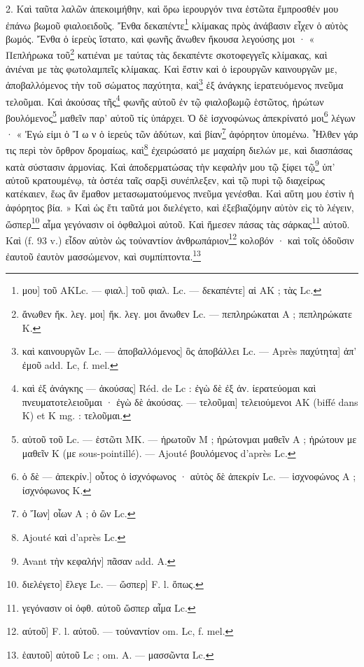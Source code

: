 \documentclass[landscape, a4paper, 11pt, oneside, polutonikogreek, french]{article}
\begin{document}
2. Καὶ ταῦτα λαλῶν ἀπεκοιμήθην, καὶ ὅρω ἱερουργόν τινα ἑστῶτα ἔμπροσθέν μου ἐπάνω βωμοῦ φιαλοειδοῦς. Ἔνθα δεκαπέντε\footnote{μου] τοῦ AKLc. --- φιαλ.] τοῦ φιαλ. Lc. --- δεκαπέντε] αἱ AK ; τὰς Lc.} κλίμακας πρὸς ἀνάβασιν εἶχεν ὁ αὐτὸς βωμός. Ἔνθα ὁ ίερεὺς ἵστατο, καὶ φωνῆς ἄνωθεν ἤκουσα λεγούσης μοι · « Πεπλήρωκα τοῦ\footnote{ἄνωθεν ἤκ. λεγ. μοι] ἤκ. λεγ. μοι ἄνωθεν Lc. --- πεπληρώκαται A ; πεπληρώκατε K.} κατιέναι με ταύτας τὰς δεκαπέντε σκοτοφεγγεῖς κλίμακας, καὶ ἀνιέναι με τὰς φωτολαμπεῖς κλίμακας. Καὶ ἔστιν καὶ ὁ ἱερουργῶν καινουργῶν με, ἀποβαλλόμενος τὴν τοῦ σώματος παχύτητα, καὶ\footnote{καὶ καινουργῶν Lc. --- ἀποβαλλόμενος] ὃς ἀποβάλλει Lc. --- Après παχύτητα] ἀπ' ἐμοῦ add. Lc, f. mel.} ἐξ ἀνάγκης ἱερατευόμενος πνεῦμα τελοῦμαι. Καὶ ἀκούσας τῆς\footnote{καὶ ἐξ ἀνάγκης --- ἀκούσας] Réd. de Lc : ἐγὼ δὲ ἐξ ἀν. ίερατεύομαι καὶ πνευματοτελειοῦμαι · ἐγὼ δὲ ἀκούσας. --- τελοῦμαι] τελειούμενοι AK (biffé dans K) et K mg. : τελοῦμαι.} φωνῆς αὐτοῦ ἐν τῷ φιαλοβωμῷ ἑστῶτος, ἠρώτων βουλόμενος\footnote{αὐτοῦ τοῦ Lc. --- ἑστῶτι MK. --- ἠρωτοῦν M ; ἡρώτονμαι μαθεῖν A ; ἠρώτουν με μαθεῖν K (με sous-pointillé). --- Ajouté βουλόμενος d'après Lc.} μαθεῖν παρ' αὐτοῦ τίς ὑπάρχει. Ὁ δὲ ἰσχνοφώνως ἀπεκρίνατό μοι\footnote{ὁ δὲ --- ἀπεκρίν.] οὗτος ὁ ἰσχνόφωνος · αὐτὸς δὲ ἀπεκρίν Lc. --- ἰσχνοφώνος A ; ίσχνόφωνος K.} λέγων · « Ἐγώ εἰμι ὁ Ἴ ω ν ὁ ἰερεὐς τῶν ἀδύτων, καὶ βίαν\footnote{ὁ Ἴων] οἶων A ; ὁ ὢν Lc.} ἀφόρητον ὑπομένω. Ἦλθεν γάρ τις περὶ τὸν ὄρθρον δρομαίως, καὶ\footnote{Ajouté καὶ d'après Lc.} ἐχειρώσατό με μαχαίρη διελών με, καὶ διασπάσας κατὰ σύστασιν ἀρμονίας. Καὶ ἀποδερματώσας τὴν κεφαλήν μου τῷ ξίφει τῷ\footnote{Avant τὴν κεφαλήν] πᾶσαν add. A.} ὑπ' αὐτοῦ κρατουμένῳ, τὰ ὀστέα ταῖς σαρξὶ συνέπλεξεν, καὶ τῷ πυρὶ τῷ διαχείρως κατέκαιεν, ἕως ἂν ἔμαθον μετασωματούμενος πνεῦμα γενέσθαι. Καὶ αὕτη μου ἐστὶν ἡ ἀφόρητος βία. » Καὶ ὡς ἔτι ταῦτά μοι διελέγετο, καὶ ἐξεβιαζόμην αὐτὸν εὶς τὸ λέγειν, ὥσπερ\footnote{διελέγετο] ἔλεγε Lc. --- ὥσπερ] F. l. ὄπως.} αἷμα γεγόνασιν οἱ ὀφθαλμοὶ αὐτοῦ. Καὶ ἤμεσεν πάσας τὰς σάρκας\footnote{γεγόνασιν οἱ ὀφθ. αὐτοῦ ὥσπερ αἷμα Lc.} αὐτοῦ. Καὶ (f. 93 v.) εἶδον αὐτὸν ὡς τοὐναντίον ἀνθρωπάριον\footnote{αύτοῦ] F. l. αὐτοῦ. --- τοὐναντίον om. Lc, f. mel.} κολοβόν · καὶ τοῖς ὀδοῦσιν ἐαυτοῦ ἐαυτὸν μασσώμενον, καὶ συμπίπτοντα.\footnote{ἑαυτοῦ] αὐτοῦ Lc ; om. A. --- μασσῶντα Lc.}
\end{document}
